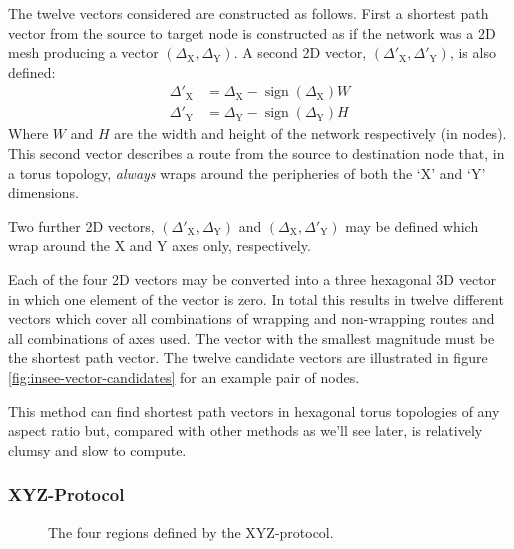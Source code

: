 				The twelve vectors considered are constructed as follows.  First a
				shortest path vector from the source to target node is constructed as if
				the network was a 2D mesh producing a vector
				$(\Delta_\textrm{X},\Delta_\textrm{Y})$. A second 2D vector,
				$(\Delta'_\textrm{X},\Delta'_\textrm{Y})$, is also defined:
				\begin{align*}
					\Delta'_\textrm{X} &= \Delta_\textrm{X} - \operatorname{sign}(\Delta_\textrm{X})W
					\\
					\Delta'_\textrm{Y} &= \Delta_\textrm{Y} - \operatorname{sign}(\Delta_\textrm{Y})H
				\end{align*}
				Where $W$ and $H$ are the width and height of the network respectively
				(in nodes). This second vector describes a route from the source to
				destination node that, in a torus topology, \emph{always} wraps around
				the peripheries of both the `X' and `Y' dimensions.
				
				Two further 2D vectors, $(\Delta'_\textrm{X},\Delta_\textrm{Y})$ and
				$(\Delta_\textrm{X},\Delta'_\textrm{Y})$ may be defined which wrap around
				the X and Y axes only, respectively.
				
				Each of the four 2D vectors may be converted into a three hexagonal 3D
				vector in which one element of the vector is zero. In total this results
				in twelve different vectors which cover all combinations of wrapping and
				non-wrapping routes and all combinations of axes used. The vector with
				the smallest magnitude must be the shortest path vector. The twelve
				candidate vectors are illustrated in figure
				\ref{fig:insee-vector-candidates} for an example pair of nodes.
				
				This method can find shortest path vectors in hexagonal torus topologies
				of any aspect ratio but, compared with other methods as we'll see later,
				is relatively clumsy and slow to compute.
			
			\subsubsection{XYZ-Protocol}
				
				\begin{figure}
					\center
					
					\caption{The four regions defined by the XYZ-protocol.}
					\label{fig:xyz-protocol-regions}
				\end{figure}
			
